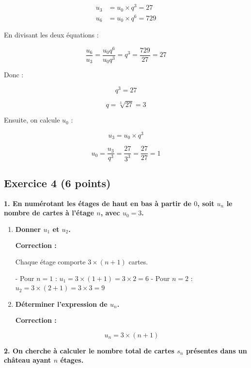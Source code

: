 \documentclass{article}
\begin{document}
\begin{enumerate}[label=\alph*)]
\begin{align*}
u_3 &= u_0 \times q^3 = 27 \\
u_6 &= u_0 \times q^6 = 729
\end{align*}

En divisant les deux équations :

\[ \dfrac{u_6}{u_3} = \dfrac{u_0 q^6}{u_0 q^3} = q^3 = \dfrac{729}{27} = 27 \]

Donc :

\[ q^3 = 27 \]

\[ q = \sqrt[3]{27} = 3 \]

Ensuite, on calcule \( u_0 \) :

\[ u_3 = u_0 \times q^3 \]

\[ u_0 = \dfrac{u_3}{q^3} = \dfrac{27}{3^3} = \dfrac{27}{27} = 1 \]

\end{enumerate}

\bigskip

\subsection*{Exercice 4 (6 points)}

\textbf{1. En numérotant les étages de haut en bas à partir de \( 0 \), soit \( u_n \) le nombre de cartes à l'étage \( n \), avec \( u_0 = 3 \).}

\begin{enumerate}[label=\alph*)]

\item \textbf{Donner \( u_1 \) et \( u_2 \).}

\textbf{Correction :}

Chaque étage comporte \( 3 \times (n + 1) \) cartes.

- Pour \( n = 1 \) : \( u_1 = 3 \times (1 + 1) = 3 \times 2 = 6 \)
- Pour \( n = 2 \) : \( u_2 = 3 \times (2 + 1) = 3 \times 3 = 9 \)

\bigskip

\item \textbf{Déterminer l'expression de \( u_n \).}

\textbf{Correction :}

\[ u_n = 3 \times (n + 1) \]

\end{enumerate}

\bigskip

\textbf{2. On cherche à calculer le nombre total de cartes \( s_n \) présentes dans un château ayant \( n \) étages.}
\end{document}
